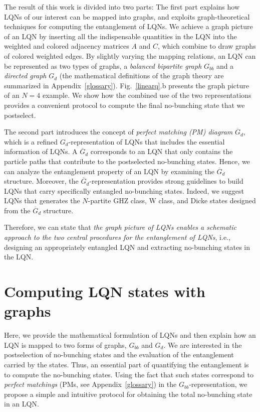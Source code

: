 \documentclass[a4paper,twocolumn,8pt,accepted=2021-12-15]{quantumarticle}
\def\dc{{\overline{G}_d }}
\begin{document}
	The result of this work is divided into two parts: 
	The first part explains how LQNs of our interest can be mapped into graphs, and exploits graph-theoretical techniques for computing the entanglement of LQNs.   
	We achieve a graph picture of an LQN by inserting all the indispensable quantities in the LQN into the weighted and colored adjacency matrices $A$ and $C$, which combine to draw graphs of colored weighted edges. By slightly varying the mapping relations, an LQN can be represented as two types of graphs, a \emph{balanced bipartite graph} $G_{bb}$ and a \emph{directed graph} $G_d$ (the mathematical definitions of the graph theory are summarized in Appendix~\ref{glossary}). Fig.~\ref{linearq}.b presents the graph picture of an $N=4$ example.
	We show how the combined use of the two representations provides a convenient protocol to compute the final no-bunching state that we postselect.
	
	The second part introduces the concept of \emph{perfect matching (PM) diagram} $\dc$, which is a refined $G_d$-representation of LQNs that includes the essential information of LQNs. A $\dc$ corresponds to an LQN that only contains the particle paths that contribute to the postselected no-bunching states. Hence, we can analyze the entanglement property of an LQN by examining the $\dc$ structure. Moreover, the $\dc$-representation provides strong guidelines to build LQNs that carry specifically entangled no-bunching states. Indeed, we suggest LQNs that generates the $N$-partite GHZ class, W class, and Dicke states designed from the $\dc$ structure. 
	
	Therefore, we can state that \emph{the graph picture of LQNs enables a schematic approach to the two central procedures for the entanglement of LQNs}, i.e., designing an appropriately entangled LQN and extracting no-bunching states in the LQN.

	
	\section{Computing LQN states with graphs}\label{LQNstoGraphs}
	
	Here, we provide the mathematical formulation of LQNs and then explain how an LQN is mapped to two forms of graphs, $G_{bb}$ and $G_{d}$. 
	We are interested in the postselection of no-bunching states and the evaluation of the entanglement carried by the states. Thus, 
	an essential part of quantifying the entanglement is to compute the no-bunching states. Using the fact that such states correspond to \emph{perfect matchings} (PMs, see Appendix~\ref{glossary}) in the $G_{bb}$-representation, we propose a simple and intuitive protocol for obtaining the total no-bunching state in an LQN. 
	
\end{document}
